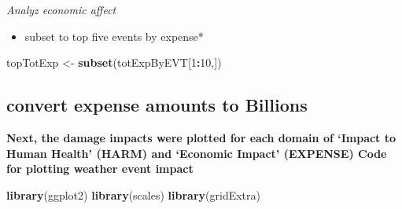 \documentclass[]{article}
\newenvironment{Shaded}{\begin{snugshade}}{\end{snugshade}}
\newcommand{\KeywordTok}[1]{\textcolor[rgb]{0.13,0.29,0.53}{\textbf{#1}}}
\newcommand{\DecValTok}[1]{\textcolor[rgb]{0.00,0.00,0.81}{#1}}
\newcommand{\StringTok}[1]{\textcolor[rgb]{0.31,0.60,0.02}{#1}}
\newcommand{\OperatorTok}[1]{\textcolor[rgb]{0.81,0.36,0.00}{\textbf{#1}}}
\newcommand{\NormalTok}[1]{#1}
\providecommand{\tightlist}{%
  \setlength{\itemsep}{0pt}\setlength{\parskip}{0pt}}
\begin{document}
\emph{Analyz economic affect }

\begin{Shaded}
\end{Shaded}

\begin{itemize}
\tightlist
\item
  subset to top five events by expense*
\end{itemize}

\begin{Shaded}
\begin{Highlighting}[]
\NormalTok{topTotExp <-}\StringTok{ }\KeywordTok{subset}\NormalTok{(totExpByEVT[}\DecValTok{1}\OperatorTok{:}\DecValTok{10}\NormalTok{,])}
\end{Highlighting}
\end{Shaded}

\subsection{convert expense amounts to
Billions}\label{convert-expense-amounts-to-billions}

\begin{Shaded}
\end{Shaded}

\textbf{Next, the damage impacts were plotted for each domain of `Impact
to Human Health' (HARM) and `Economic Impact' (EXPENSE) Code for
plotting weather event impact}

\begin{Shaded}
\begin{Highlighting}[]
\KeywordTok{library}\NormalTok{(ggplot2)}
\KeywordTok{library}\NormalTok{(scales)}
\KeywordTok{library}\NormalTok{(gridExtra)}
\end{Highlighting}
\end{Shaded}
\end{document}
